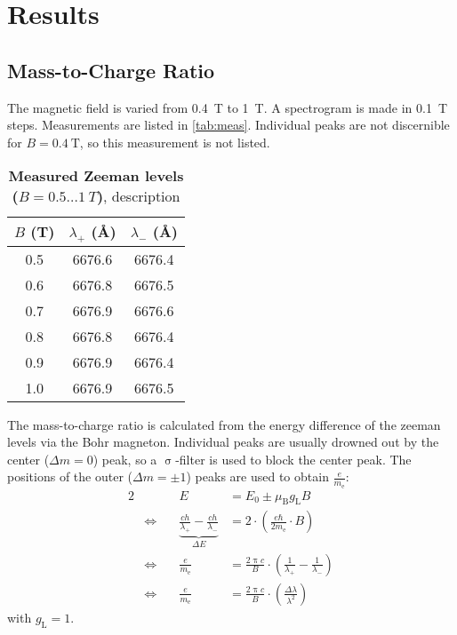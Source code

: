\chapter{Results}
\section{Mass-to-Charge Ratio}
The magnetic field is varied from \SI{0.4}{\tesla} to \SI{1}{\tesla}.
A spectrogram is made  in \SI{0.1}{\tesla} steps.
Measurements are listed in \autoref{tab:meas}.
Individual peaks are not discernible for $B = \SI{0.4}{\tesla}$, so this measurement is not listed.

\begin{table}[tbp]
	\centering
	\caption[Measured Zeeman levels ($B = \num{0.5} \dots \SI{1}{T}$)]{\textbf{Measured Zeeman levels ($B = \num{0.5} \dots \SI{1}{T}$)}, description}
	\label{tab:meas}
	\begin{tabular}{SSS}
		\toprule
		{$B$ (\si{\tesla})}& {$\lambda_+$ (\si{\angstrom})}& {$\lambda_-$ (\si{\angstrom})}\\
		&	6676.6&	6676.4\\
		0.6&	6676.8&	6676.5\\
		0.7&	6676.9&	6676.6\\
		0.8&	6676.8&	6676.4\\
		0.9&	6676.9&	6676.4\\
		1.0&	6676.9&	6676.5\\
		\bottomrule
	\end{tabular}
\end{table}

The mass-to-charge ratio is calculated from the energy difference of the zeeman levels via the Bohr magneton.
Individual peaks are usually drowned out by the center ($\Delta m = 0$) peak, so a $\upsigma$-filter is used to block the center peak.
The positions of the outer ($\Delta m = \pm 1$) peaks are used to obtain $\frac{e}{m_\text{e}}$:
\begin{alignat}{2}
	& &E &= E_0 \pm \mu_\text{B} g_\text{L} B\\
	&\Leftrightarrow \quad &\underbrace{\frac{c h}{\lambda_+} - \frac{c h}{\lambda_-}}_{\Delta E} &=
	2 \cdot \left(\frac{e \hbar}{2 m_\text{e}} \cdot B \right)\\
	&\Leftrightarrow &\frac{e}{m_\text{e}} &= \frac{2 \uppi c}{B} \cdot \left(\frac{1}{\lambda_+} - \frac{1}{\lambda_-}\right)\\
	&\Leftrightarrow &\frac{e}{m_\text{e}} &= \frac{2 \uppi c}{B} \cdot \left(\frac{\Delta \lambda}{\lambda^2}\right)
\end{alignat}
with $g_\text{L} = 1$.

